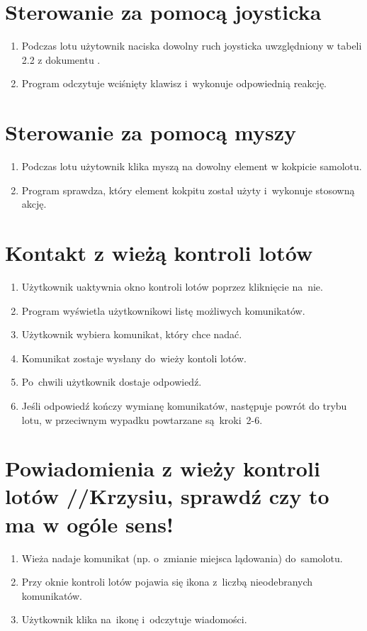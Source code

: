 \documentclass{mwrep}
\begin{document}
\section{Sterowanie za pomocą joysticka}
\begin{enumerate}
  \item Podczas lotu użytownik naciska dowolny ruch joysticka uwzględniony w tabeli 2.2 z dokumentu \cite{WYM}.
  \item Program odczytuje wciśnięty klawisz i~wykonuje odpowiednią reakcję.
\end{enumerate}

\section{Sterowanie za pomocą myszy}
\begin{enumerate}
  \item Podczas lotu użytownik klika myszą na dowolny element w kokpicie samolotu.
  \item Program sprawdza, który element kokpitu został użyty i~wykonuje stosowną akcję.
\end{enumerate}

\section{Kontakt z wieżą kontroli lotów}
\begin{enumerate}
  \item Użytkownik uaktywnia okno kontroli lotów poprzez kliknięcie na~nie.
  \item Program wyświetla użytkownikowi listę możliwych komunikatów.
  \item Użytkownik wybiera komunikat, który chce nadać.
  \item Komunikat zostaje wysłany do~wieży kontoli lotów.
  \item Po~chwili użytkownik dostaje odpowiedź.
  \item Jeśli odpowiedź kończy wymianę komunikatów, następuje powrót do trybu lotu, w przeciwnym wypadku powtarzane są~kroki~2-6.
\end{enumerate}

\section{Powiadomienia z wieży kontroli lotów //Krzysiu, sprawdź czy to ma w ogóle sens!}
\begin{enumerate}
  \item Wieża nadaje komunikat (np. o~zmianie miejsca lądowania) do~samolotu.
  \item Przy oknie kontroli lotów pojawia się ikona z~liczbą nieodebranych komunikatów.
  \item Użytkownik klika na~ikonę i~odczytuje wiadomości.
\end{enumerate}
\end{document}
